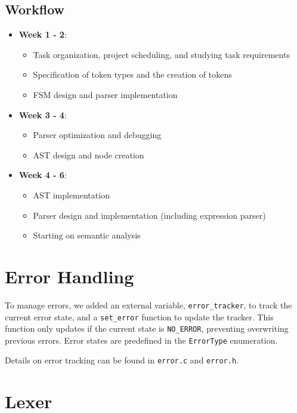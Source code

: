 \documentclass[12pt,a4paper]{article}
\begin{document}
\subsection{Workflow}
\begin{itemize}
    \item \textbf{Week 1 - 2}: 
    \begin{itemize}
        \item Task organization, project scheduling, and studying task requirements
        \item Specification of token types and the creation of tokens
        \item FSM design and parser implementation
    \end{itemize}
    \item \textbf{Week 3 - 4}:
    \begin{itemize}
        \item Parser optimization and debugging
        \item AST design and node creation
    \end{itemize}
    \item \textbf{Week 4 - 6}:
    \begin{itemize}
        \item AST implementation
        \item Parser design and implementation (including expression parser)
        \item Starting on semantic analysis 
    \end{itemize}
\end{itemize}

\newpage

\section{Error Handling}
To manage errors, we added an external variable, \texttt{error\_tracker}, to track the current error state, and a \texttt{set\_error} function to update the tracker. This function only updates if the current state is \texttt{NO\_ERROR}, preventing overwriting previous errors. Error states are predefined in the \texttt{ErrorType} enumeration.

Details on error tracking can be found in \texttt{error.c} and \texttt{error.h}.

\section{Lexer}
\end{document}
